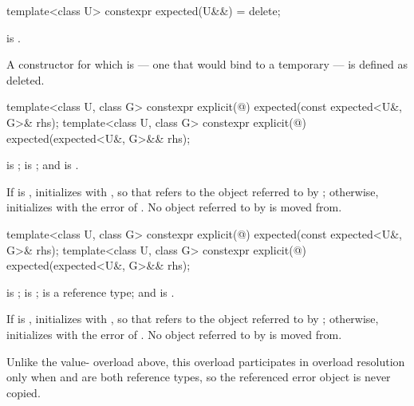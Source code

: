 %
\begin{itemdecl}
template<class U>
  constexpr expected(U&&) = delete;
\end{itemdecl}

\begin{itemdescr}
\pnum
\constraints
{} is .

\pnum
\remarks
A constructor for which  is  — one that would bind  to a temporary — is defined as deleted.
\end{itemdescr}

%
\begin{itemdecl}
template<class U, class G>
  constexpr explicit(@\seebelow@) expected(const expected<U&, G>& rhs);
template<class U, class G>
  constexpr explicit(@\seebelow@) expected(expected<U&, G>&& rhs);
\end{itemdecl}

\begin{itemdescr}
\pnum
\constraints
{} is ;  is ; and  is .

\pnum
\effects
If  is , initializes  with , so that  refers to the object referred to by ; otherwise, initializes  with the error of . No object referred to by  is moved from.
\end{itemdescr}

%
\begin{itemdecl}
template<class U, class G>
  constexpr explicit(@\seebelow@) expected(const expected<U&, G>& rhs);
template<class U, class G>
  constexpr explicit(@\seebelow@) expected(expected<U&, G>&& rhs);
\end{itemdecl}

\begin{itemdescr}
\pnum
\constraints
{} is ;  is ;  is a reference type; and  is .

\pnum
\effects
If  is , initializes  with , so that  refers to the object referred to by ; otherwise, initializes  with the error of . No object referred to by  is moved from.

\pnum
\remarks
Unlike the value- overload above, this overload participates in overload resolution only when  and  are both reference types, so the referenced error object is never copied.
\end{itemdescr}

